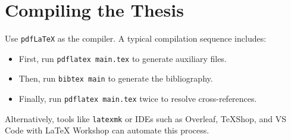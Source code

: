\section{Compiling the Thesis}
\begin{paragraph}
Use \texttt{pdfLaTeX} as the compiler. A typical compilation sequence includes:
\begin{itemize}[leftmargin=\paritemindent]
    \item First, run \texttt{pdflatex main.tex} to generate auxiliary files.
    \item Then, run \texttt{bibtex main} to generate the bibliography.
    \item Finally, run \texttt{pdflatex main.tex} twice to resolve cross-references.
\end{itemize}

Alternatively, tools like \texttt{latexmk} or IDEs such as Overleaf, TeXShop, and VS Code with {\LaTeX} Workshop can automate this process.
\end{paragraph}